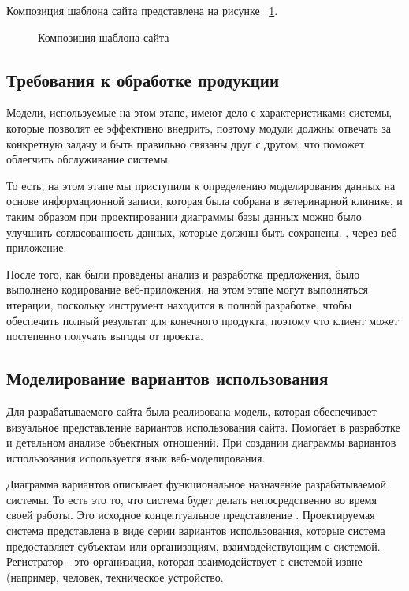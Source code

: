Композиция шаблона сайта представлена на рисунке ~\ref{templ:image}.

\begin{figure}[H]
\caption{Композиция шаблона сайта}
\label{templ:image}
\end{figure}

\subsection{Требования к обработке продукции}

Модели, используемые на этом этапе, имеют дело с характеристиками системы, которые позволят ее эффективно внедрить, поэтому модули должны отвечать за конкретную задачу и быть правильно связаны друг с другом, что поможет облегчить обслуживание системы.

То есть, на этом этапе мы приступили к определению моделирования данных на основе информационной записи, которая была собрана в ветеринарной клинике, и таким образом при проектировании диаграммы базы данных можно было улучшить согласованность данных, которые должны быть сохранены. , через веб-приложение.

После того, как были проведены анализ и разработка предложения, было выполнено кодирование веб-приложения, на этом этапе могут выполняться итерации, поскольку инструмент находится в полной разработке, чтобы обеспечить полный результат для конечного продукта, поэтому что клиент может постепенно получать выгоды от проекта.

\subsection{Моделирование вариантов использования}

Для разрабатываемого сайта была реализована модель, которая обеспечивает визуальное представление вариантов использования сайта.
Помогает в разработке и детальном анализе объектных отношений. При создании диаграммы вариантов использования используется язык веб-моделирования.

Диаграмма вариантов описывает функциональное назначение разрабатываемой системы. То есть это то, что система будет делать непосредственно во время своей работы. Это исходное концептуальное представление . Проектируемая система представлена в виде серии вариантов использования, которые система предоставляет субъектам или организациям, взаимодействующим с системой. Регистратор - это организация, которая взаимодействует с системой извне (например, человек, техническое устройство.

